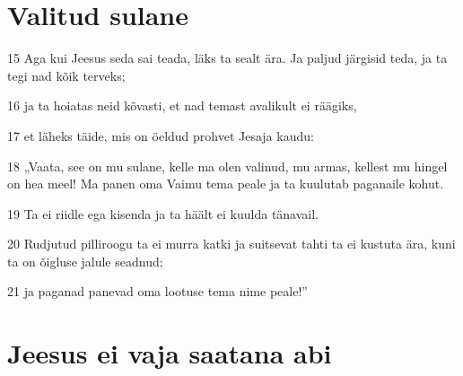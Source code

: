 \section*{Valitud sulane}

\par 15 Aga kui Jeesus seda sai teada, läks ta sealt ära. Ja paljud järgisid teda, ja ta tegi nad kõik terveks;
\par 16 ja ta hoiatas neid kõvasti, et nad temast avalikult ei räägiks,
\par 17 et läheks täide, mis on öeldud prohvet Jesaja kaudu:
\par 18 „Vaata, see on mu sulane, kelle ma olen valinud, mu armas, kellest mu hingel on hea meel! Ma panen oma Vaimu tema peale ja ta kuulutab paganaile kohut.
\par 19 Ta ei riidle ega kisenda ja ta häält ei kuulda tänavail.
\par 20 Rudjutud pilliroogu ta ei murra katki ja suitsevat tahti ta ei kustuta ära, kuni ta on õigluse jalule seadnud;
\par 21 ja paganad panevad oma lootuse tema nime peale!”

\section*{Jeesus ei vaja saatana abi}

